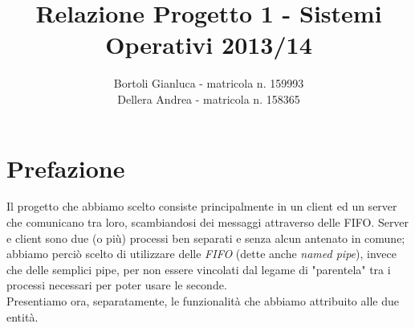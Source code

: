 \documentclass[a4paper,9pt]{article}
\begin{document}
\author{Bortoli Gianluca - matricola n. 159993\\Dellera Andrea - matricola n. 158365}
\title{Relazione Progetto 1 - Sistemi Operativi 2013/14}
\maketitle
\pagebreak

\section{Prefazione}
Il progetto che abbiamo scelto consiste principalmente in un client ed un server che comunicano tra loro, scambiandosi dei messaggi attraverso delle FIFO. Server e client sono due (o più) processi ben separati e senza alcun antenato in comune; abbiamo perciò scelto di utilizzare delle \emph{FIFO} (dette anche \emph{named pipe}), invece che delle semplici pipe, per non essere vincolati dal legame di "parentela" tra i processi necessari per poter usare le seconde.\\
Presentiamo ora, separatamente, le funzionalità che abbiamo attribuito alle due entità.
\end{document}
